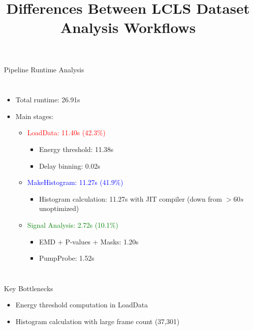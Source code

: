 \documentclass{beamer}
\title{Differences Between LCLS Dataset Analysis Workflows}
\begin{document}

\begin{frame}{Pipeline Runtime Analysis}
\begin{columns}
\begin{itemize}
\item Total runtime: 26.91s
\item Main stages:
    \begin{itemize}
    \item \textcolor{red}{LoadData: 11.40s (42.3\%)}
        \begin{itemize}
        \item Energy threshold: 11.38s
        \item Delay binning: 0.02s
        \end{itemize}
    \item \textcolor{blue}{MakeHistogram: 11.27s (41.9\%)}
        \begin{itemize}
          \item Histogram calculation: 11.27s with JIT compiler (down from $>60s$ unoptimized)
        \end{itemize}
    \item \textcolor{green}{Signal Analysis: 2.72s (10.1\%)}
        \begin{itemize}
        \item EMD + P-values + Masks: 1.20s
        \item PumpProbe: 1.52s
        \end{itemize}
    \end{itemize}
\end{itemize}

\end{columns}

\vspace{0.3cm}
\begin{block}{Key Bottlenecks}
\begin{itemize}
\item Energy threshold computation in LoadData
\item Histogram calculation with large frame count (37,301)
\end{itemize}
\end{block}
\end{frame}
\end{document}
